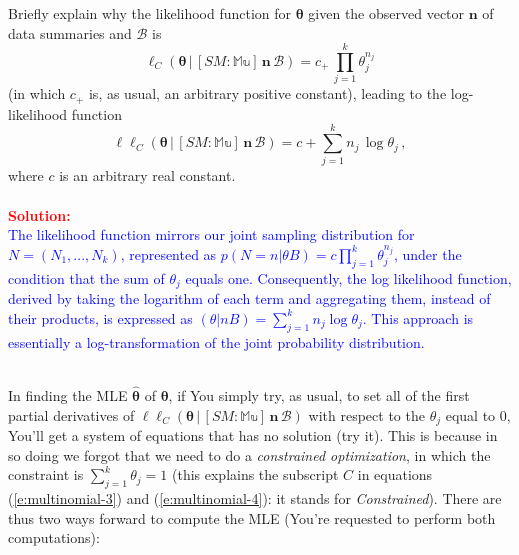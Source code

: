 \documentclass[12pt]{article}
\newcommand{\given}{\, | \,}
\begin{document}
\begin{itemize}
\begin{itemize}
\begin{itemize}
Briefly explain why the likelihood function for $\bm{ \theta }$ given the observed vector $\bm{ n }$ of data summaries and $\mathcal{ B }$ is
\begin{equation} \label{e:multinomial-3}
\ell_C ( \bm{ \theta } \given [ SM \! \! : \mathbb{ Mu } ] \, \bm{ n } \, \mathcal{ B } ) = c_+ \, \prod_{ j = 1 }^k \theta_j^{ n_j }
\end{equation}
(in which $c_+$ is, as usual, an arbitrary positive constant), leading to the log-likelihood function
\begin{equation} \label{e:multinomial-4}
\ell \ell_C ( \bm{ \theta } \given [ SM \! \! : \mathbb{ Mu } ] \, \bm{ n } \, \mathcal{ B } ) = c + \sum_{ j = 1 }^k n_j \, \log \theta_j \, ,
\end{equation}
where $c$ is an arbitrary real constant. \fbox{\textbf{\textit{[10 points]}}} 
\\ \\ 
\textcolor{red}{\textbf{Solution:}} \\
\textcolor{blue}{The likelihood function mirrors our joint sampling distribution for \( N = (N_1, ..., N_k) \), represented as \( p(N = n | \theta B) = c \prod_{j=1}^{k} \theta_j^{n_j} \), under the condition that the sum of \( \theta_j \) equals one. Consequently, the log likelihood function, derived by taking the logarithm of each term and aggregating them, instead of their products, is expressed as \( (\theta | n B) = \sum_{j=1}^{k} n_j \log \theta_j \). This approach is essentially a log-transformation of the joint probability distribution.} \\ \\ 

\end{itemize}

In finding the MLE $\hat{ \bm{ \theta } }$ of $\bm{ \theta }$, if You simply try, as usual, to set all of the first partial derivatives of $\ell \ell_C ( \bm{ \theta } \given [ SM \! \! : \mathbb{ Mu } ] \, \bm{ n } \, \mathcal{ B } )$ with respect to the $\theta_j$ equal to 0, You'll get a system of equations that has no solution (try it). This is because in so doing we forgot that we need to do a \textit{constrained optimization}, in which the constraint is $\sum_{ j = 1 }^k \theta_j = 1$ (this explains the subscript $C$ in equations (\ref{e:multinomial-3}) and (\ref{e:multinomial-4}): it stands for \textit{Constrained}). There are thus two ways forward to compute the MLE (You're requested to perform both computations):

\begin{itemize}


\end{itemize}
\end{itemize}
\end{itemize}
\end{document}

